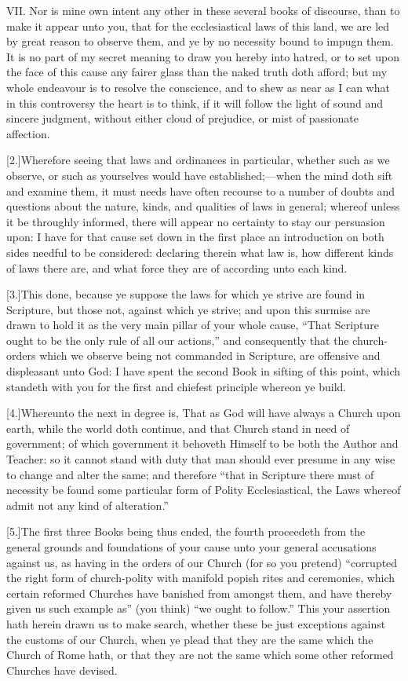 VII. Nor is mine own intent any other in these several books of discourse, than to make it appear unto you, that for the ecclesiastical laws of this land, we are led by great reason to observe them, and ye by no necessity bound to impugn them. It is no part of my secret meaning to draw you hereby into hatred, or to set upon the face of this cause any fairer glass than the naked truth doth afford; but my whole endeavour is to resolve the conscience, and to shew as near as I can what in this controversy the heart is to think, if it will follow the light of sound and sincere judgment, without either cloud of prejudice, or mist of passionate affection.

[2.]Wherefore seeing that laws and ordinances in particular, whether such as we observe, or such as yourselves would have established;—when the mind doth sift and examine them, it must needs have often recourse to a number of doubts and questions about the nature, kinds, and qualities of laws in general; whereof unless it be throughly informed, there will appear no certainty to stay our persuasion upon: I have for that cause set down in the first place an introduction on both sides needful to be considered: declaring therein what law is, how different kinds of laws there are, and what force they are of according unto each kind.

[3.]This done, because ye suppose the laws for which ye strive are found in Scripture, but those not, against which ye strive; and upon this surmise are drawn to hold it as the very main pillar of your whole cause, “That Scripture ought to be the only rule of all our actions,” and consequently that the church-orders which we observe being not commanded in Scripture, are offensive and displeasant unto God: I have spent the second Book in sifting of this point, which standeth with you for the first and chiefest principle whereon ye build.

[4.]Whereunto the next in degree is, That as God will have always a Church upon earth, while the world doth continue, and that Church stand in need of government; of which government it behoveth Himself to be both the Author and Teacher: so it cannot stand with duty that man should ever presume in any wise to change and alter the same; and therefore “that in Scripture there must of necessity be found some particular form of Polity Ecclesiastical, the Laws whereof admit not any kind of alteration.”

[5.]The first three Books being thus ended, the fourth proceedeth from the general grounds and foundations of your cause unto your general accusations against us, as having in the orders of our Church (for so you pretend) “corrupted the right form of church-polity with manifold popish rites and ceremonies, which certain reformed Churches have banished from amongst them, and have thereby given us such example as” (you think) “we ought to follow.” This your assertion hath herein drawn us to make search, whether these be just exceptions against the customs of our Church, when ye plead that they are the same which the Church of Rome hath, or that they are not the same which some other reformed Churches have devised.

